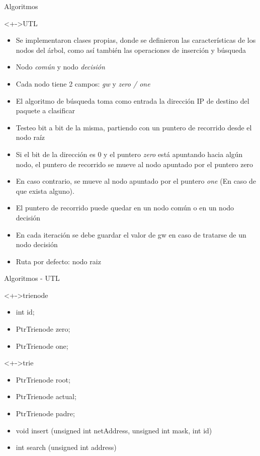 \documentclass[xcolor=dvipsnames]{beamer}
\begin{document}
\begin{frame}{Algoritmos}
\begin{block}<+->{UTL}   
    \begin{itemize}
      \scriptsize
     	
     	\item Se implementaron clases propias, donde se definieron las características de los nodos del árbol, como así también las operaciones de inserción y búsqueda
     	\item Nodo \emph{común} y nodo \emph{decisión}
	\item Cada nodo tiene 2 campos: \emph{gw} y \emph{zero / one}
	\item El algoritmo de búsqueda toma como entrada la dirección IP de destino del paquete a clasificar
	\item Testeo bit a bit de la misma, partiendo con un puntero de recorrido desde el nodo raíz
	\item Si el bit de la dirección es 0 y el puntero \emph{zero} está apuntando hacia algún nodo, el puntero de recorrido se mueve al nodo apuntado por el puntero zero
	\item En caso contrario, se mueve al nodo apuntado por el puntero \emph{one} (En caso de que exista alguno).
	\item El puntero de recorrido puede quedar en un nodo común o en un nodo decisión
	\item En cada iteración se debe guardar el valor de gw en caso de tratarse de un nodo decisión
	\item Ruta por defecto: nodo raiz
    \end{itemize}
  \end{block}
\end{frame}


\begin{frame}{Algoritmos - UTL}
\begin{block}<+->{trienode}   
    \begin{itemize}
      \scriptsize
     	\item int id;
     	\item PtrTrienode zero;
     	\item PtrTrienode one;
    \end{itemize}
  \end{block}

\begin{block}<+->{trie}   
    \begin{itemize}
      \scriptsize
     	\item PtrTrienode root;
	\item PtrTrienode actual;
	\item PtrTrienode padre;
	\item void insert (unsigned int netAddress, unsigned int mask, int id)
	\item int search (unsigned int address)
    \end{itemize}
  \end{block}
\end{frame}	
\end{document}
